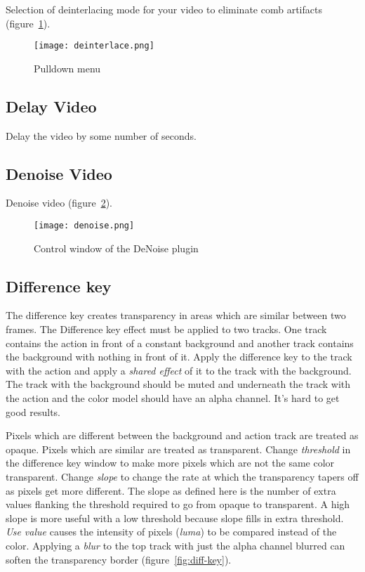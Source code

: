 Selection of deinterlacing mode for your video to eliminate comb artifacts (figure~\ref{fig:deinterlace}).

\begin{figure}[htpb]
    \centering
    \texttt{[image: deinterlace.png]}
    \caption{Pulldown menu}
    \label{fig:deinterlace}
\end{figure}

\subsection{Delay Video}%
\label{sub:delay_video}

Delay the video by some number of seconds.

\subsection{Denoise Video}%
\label{sub:denoise_video}

Denoise video (figure~\ref{fig:denoise}).

\begin{figure}[htpb]
    \centering
    \texttt{[image: denoise.png]}
    \caption{Control window of the DeNoise plugin}
    \label{fig:denoise}
\end{figure}

\subsection{Difference key}%
\label{sub:difference_key}

The difference key creates transparency in areas which are similar between two frames. The Difference key effect must be applied to two tracks. One track contains the action in front of a constant background and another track contains the background with nothing in front of it. Apply the difference key to the track with the action and apply a \textit{shared effect} of it to the track with the background. The track with the background should be muted and underneath the track with the action and the color model should have an alpha channel. It’s hard to get good results.

Pixels which are different between the background and action track are treated as opaque. Pixels which are similar are treated as transparent. Change \textit{threshold} in the difference key window to make more pixels which are not the same color transparent. Change \textit{slope} to change the rate at which the transparency tapers off as pixels get more different. The slope as defined here is the number of extra values flanking the threshold required to go from opaque to transparent. A high slope is more useful with a low threshold because slope fills in extra threshold.
\textit{Use value} causes the intensity of pixels (\textit{luma}) to be compared instead of the color. Applying a \textit{blur} to the top track with just the alpha channel blurred can soften the transparency border (figure~\ref{fig:diff-key}).

